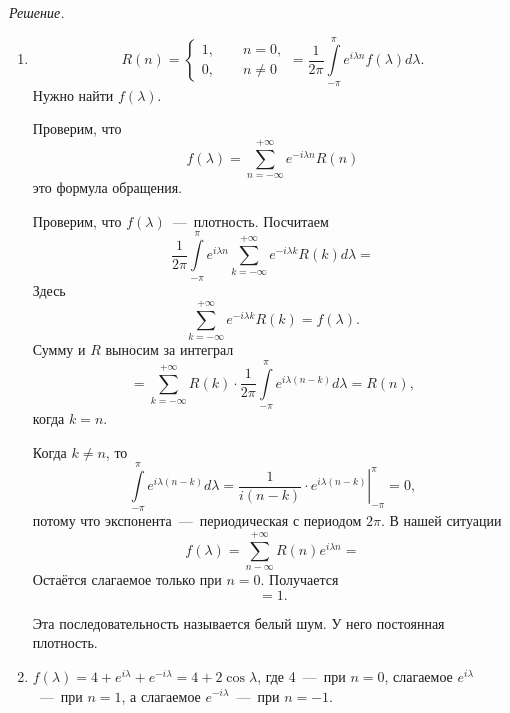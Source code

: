 \textit{Решение.}
\begin{enumerate}[label=\alph*)]
  \item
  \begin{equation*}
    R \left( n \right) =
    \begin{cases}
      1, \qquad n = 0, \\
      0, \qquad n \neq 0
    \end{cases} =
    \frac{1}{2 \pi }
    \int \limits_{-\pi }^{ \pi } e^{i \lambda n} f \left( \lambda \right) d \lambda.
  \end{equation*}
  Нужно найти $f \left( \lambda \right) $.

  Проверим, что
  \begin{equation*}
    f \left( \lambda \right) =
    \sum \limits_{n = -\infty }^{+\infty } e^{-i \lambda n} R \left( n \right)
  \end{equation*}
  это формула обращения.

  Проверим, что $f \left( \lambda \right) $~---~плотность.
  Посчитаем
  \begin{equation*}
    \frac{1}{2 \pi }
    \int \limits_{-\pi }^{ \pi }
      e^{i \lambda n} \sum \limits_{k = -\infty }^{+\infty } e^{-i \lambda k} R \left( k \right)
    d \lambda =
  \end{equation*}
  Здесь
  \begin{equation*}
    \sum \limits_{k = -\infty }^{+\infty } e^{-i \lambda k} R \left( k \right) =
    f \left( \lambda \right).
  \end{equation*}
  Сумму и $R$ выносим за интеграл
  \begin{equation*}
    = \sum \limits_{k = -\infty }^{+\infty }
      R \left( k \right) \cdot \frac{1}{2 \pi }
      \int \limits_{-\pi }^{ \pi } e^{i \lambda \left( n - k \right) } d \lambda =
    R \left( n \right),
  \end{equation*}
  когда $k = n$.

  Когда $k \neq n$, то
  \begin{equation*}
    \int \limits_{-\pi }^{ \pi } e^{i \lambda \left( n - k \right) } d \lambda =
    \left.
      \frac{1}{i \left( n - k \right) } \cdot e^{i \lambda \left( n - k \right) }
    \right|_{-\pi }^{ \pi } =
    0,
  \end{equation*}
  потому что экспонента~---~периодическая с периодом $2 \pi $.
  В нашей ситуации
  \begin{equation*}
    f \left( \lambda \right) =
    \sum \limits_{n - \infty }^{+\infty } R \left( n \right) e^{i \lambda n} =
  \end{equation*}
  Остаётся слагаемое только при $n = 0$.
  Получается
  \begin{equation*}
    = 1.
  \end{equation*}

  Эта последовательность называется белый шум.
  У него постоянная плотность.
  \item $f \left( \lambda \right) =
    4 + e^{i \lambda } + e^{-i \lambda } =
    4 + 2 \cos \lambda $,
  где 4~---~при $n = 0$, слагаемое $e^{i \lambda }$~---~при $n = 1$,
  а слагаемое $e^{-i \lambda }$~---~при $n = -1$.
\end{enumerate}
